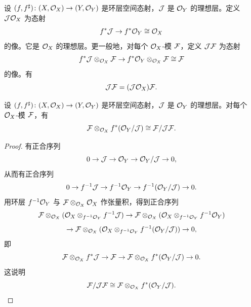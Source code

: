 设 $(f,f^\sharp)\colon(X,\cO_X)\to(Y,\cO_Y)$ 是环层空间态射，$\cJ$ 是 $\cO_Y$ 的理想层。定义 $\cJ\cO_X$ 为态射
\[
f^*\cJ\to f^*\cO_Y\cong\cO_X
\]
的像。它是 $\cO_X$ 的理想层。更一般地，对每个 $\cO_X$-模 $\cF$，定义 $\cJ\cF$ 为态射
\[
f^*\cJ\otimes_{\cO_X}\cF\to f^*\cO_Y\otimes_{\cO_X}\cF\cong\cF
\]
的像。有
\[
\cJ\cF=(\cJ\cO_X)\cF.
\]

\begin{proposition}\label{it:1.4.13}
设 $(f,f^\sharp)\colon(X,\cO_X)\to(Y,\cO_Y)$ 是环层空间态射，$\cJ$ 是 $\cO_Y$ 的理想层。对每个 $\cO_X$-模 $\cF$，有
\[
\cF\otimes_{\cO_X}f^*(\cO_Y/\cJ)\cong\cF/\cJ\cF.
\]
\end{proposition}

\begin{proof}
有正合序列
\[
0\to\cJ\to\cO_Y\to\cO_Y/\cJ\to0,
\]
从而有正合序列
\[
0\to f^{-1}\cJ\to f^{-1}\cO_Y\to f^{-1}(\cO_Y/\cJ)\to0.
\]
用环层 $f^{-1}\cO_Y$ 与 $\cF\otimes_{\cO_X}\cO_X$ 作张量积，得到正合序列
\[
\cF\otimes_{\cO_X}(\cO_X\otimes_{f^{-1}\cO_Y}f^{-1}\cJ)\to
\cF\otimes_{\cO_X}(\cO_X\otimes_{f^{-1}\cO_Y}f^{-1}\cO_Y)
\]
\[
\to\cF\otimes_{\cO_X}(\cO_X\otimes_{f^{-1}\cO_Y}f^{-1}(\cO_Y/\cJ))\to0,
\]
即
\[
\cF\otimes_{\cO_X}f^*\cJ\to\cF\to\cF\otimes_{\cO_X}f^*(\cO_Y/\cJ)\to0.
\]
这说明
\[
\cF/\cJ\cF\cong\cF\otimes_{\cO_X}f^*(\cO_Y/\cJ).
\]
\end{proof}
